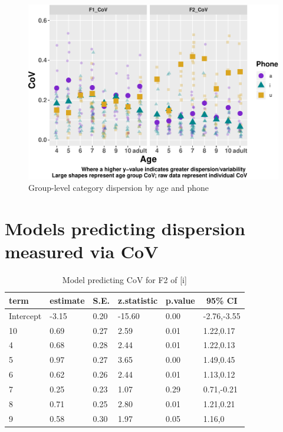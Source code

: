 \documentclass[
]{article}
\begin{document}
\begin{figure}
\centering
\includegraphics{3_vtl_results_files/figure-latex/delta-disp-fig-1.pdf}
\caption{\label{fig:delta-disp-fig}Group-level category dispersion by age and phone}
\end{figure}

\hypertarget{models-predicting-dispersion-measured-via-cov}{%
\section{Models predicting dispersion measured via CoV}\label{models-predicting-dispersion-measured-via-cov}}

\begin{table}[tbp]

\begin{center}
\begin{threeparttable}

\caption{\label{tab:f2-i-model}Model predicting CoV for F2 of [i]}

\begin{tabular}{llllll}
\toprule
term & \multicolumn{1}{c}{estimate} & \multicolumn{1}{c}{S.E.} & \multicolumn{1}{c}{z.statistic} & \multicolumn{1}{c}{p.value} & \multicolumn{1}{c}{95\% CI}\\
\midrule
Intercept & -3.15 & 0.20 & -15.60 & 0.00 & -2.76,-3.55\\
10 & 0.69 & 0.27 & 2.59 & 0.01 & 1.22,0.17\\
4 & 0.68 & 0.28 & 2.44 & 0.01 & 1.22,0.13\\
5 & 0.97 & 0.27 & 3.65 & 0.00 & 1.49,0.45\\
6 & 0.62 & 0.26 & 2.44 & 0.01 & 1.13,0.12\\
7 & 0.25 & 0.23 & 1.07 & 0.29 & 0.71,-0.21\\
8 & 0.71 & 0.25 & 2.80 & 0.01 & 1.21,0.21\\
9 & 0.58 & 0.30 & 1.97 & 0.05 & 1.16,0\\
\bottomrule
\end{tabular}

\end{threeparttable}
\end{center}

\end{table}
\end{document}
